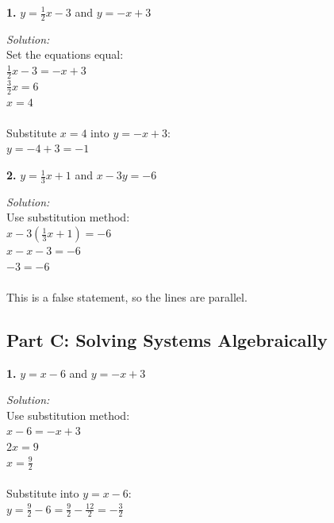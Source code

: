 \documentclass[12pt]{article}
\begin{document}
            \textbf{1.} $y = \frac{1}{2}x - 3$ and $y = -x + 3$

                \textit{Solution:}\\
                Set the equations equal:\\
                $\frac{1}{2}x - 3 = -x + 3$\\
                $\frac{3}{2}x = 6$\\
                $x = 4$\\
                \\
                Substitute $x = 4$ into $y = -x + 3$:\\
                $y = -4 + 3 = -1$


                \vspace{0.5cm}

            \textbf{2.} $y = \frac{1}{3}x + 1$ and $x - 3y = -6$

                \textit{Solution:}\\
                Use substitution method:\\
                $x - 3\left(\frac{1}{3}x + 1\right) = -6$\\
                $x - x - 3 = -6$\\
                $-3 = -6$\\
                \\
                This is a false statement, so the lines are parallel.


                \newpage

        \subsection*{Part C: Solving Systems Algebraically}

            \textbf{1.} $y = x - 6$ and $y = -x + 3$

                \textit{Solution:}\\
                Use substitution method:\\
                $x - 6 = -x + 3$\\
                $2x = 9$\\
                $x = \frac{9}{2}$\\
                \\
                Substitute into $y = x - 6$:\\
                $y = \frac{9}{2} - 6 = \frac{9}{2} - \frac{12}{2} = -\frac{3}{2}$
\end{document}
